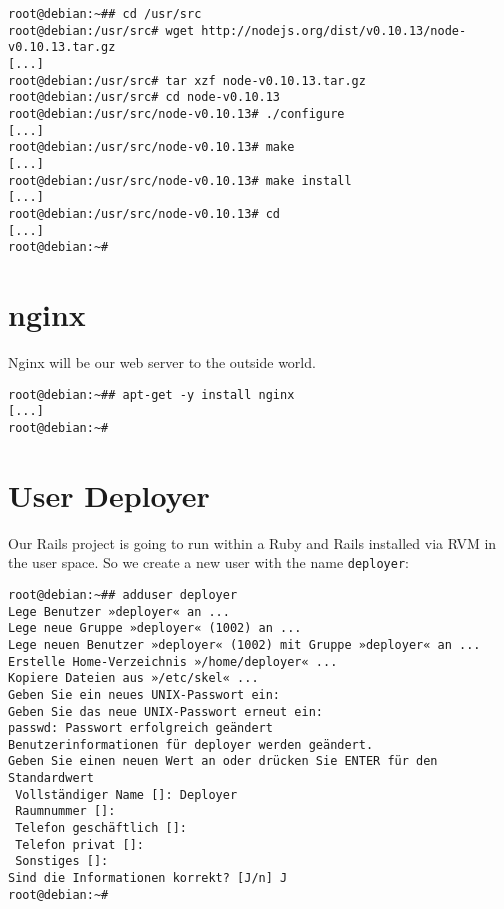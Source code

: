 \documentclass[a4paper]{book}
\begin{document}
\begin{shaded}\begin{verbatim}
root@debian:~## cd /usr/src
root@debian:/usr/src# wget http://nodejs.org/dist/v0.10.13/node-v0.10.13.tar.gz
[...]
root@debian:/usr/src# tar xzf node-v0.10.13.tar.gz
root@debian:/usr/src# cd node-v0.10.13
root@debian:/usr/src/node-v0.10.13# ./configure
[...]
root@debian:/usr/src/node-v0.10.13# make
[...]
root@debian:/usr/src/node-v0.10.13# make install
[...]
root@debian:/usr/src/node-v0.10.13# cd
[...]
root@debian:~#
\end{verbatim}\end{shaded}

\section{nginx}\label{nginx}

Nginx will be our web server to the outside world.

\begin{shaded}\begin{verbatim}
root@debian:~## apt-get -y install nginx
[...]
root@debian:~#
\end{verbatim}\end{shaded}

\section{User Deployer}\label{user-deployer}

Our Rails project is going to run within a Ruby and Rails installed via RVM in the user space. So we create a new user with the name \texttt{deployer}:

\begin{shaded}\begin{verbatim}
root@debian:~## adduser deployer
Lege Benutzer »deployer« an ...
Lege neue Gruppe »deployer« (1002) an ...
Lege neuen Benutzer »deployer« (1002) mit Gruppe »deployer« an ...
Erstelle Home-Verzeichnis »/home/deployer« ...
Kopiere Dateien aus »/etc/skel« ...
Geben Sie ein neues UNIX-Passwort ein:
Geben Sie das neue UNIX-Passwort erneut ein:
passwd: Passwort erfolgreich geändert
Benutzerinformationen für deployer werden geändert.
Geben Sie einen neuen Wert an oder drücken Sie ENTER für den Standardwert
 Vollständiger Name []: Deployer
 Raumnummer []:
 Telefon geschäftlich []:
 Telefon privat []:
 Sonstiges []:
Sind die Informationen korrekt? [J/n] J
root@debian:~#
\end{verbatim}\end{shaded}
\end{document}
